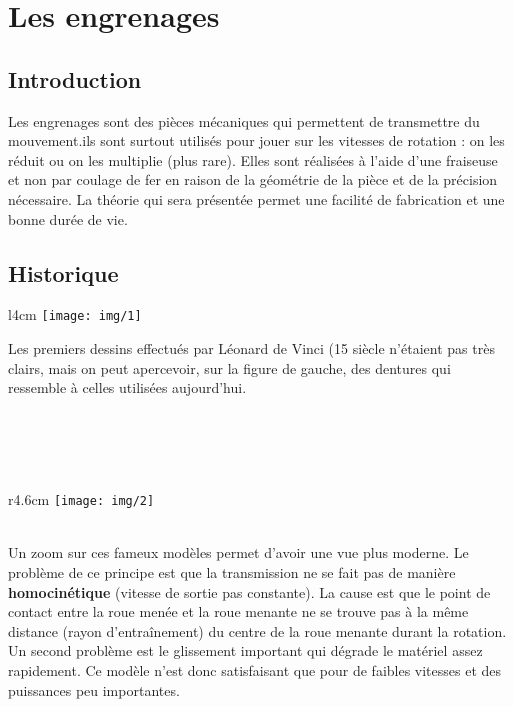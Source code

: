 
\chapter{Les engrenages}

\section{Introduction}
	\noindent Les engrenages sont des pièces mécaniques qui permettent de transmettre du mouvement.ils sont surtout utilisés pour jouer sur les vitesses de rotation : on les réduit ou on les multiplie (plus rare). Elles sont réalisées à l'aide d'une fraiseuse et non par coulage de fer en raison de la géométrie de la pièce et de la précision nécessaire. La théorie qui sera présentée permet une facilité de fabrication et une bonne durée de vie.

\section{Historique}
	\begin{wrapfigure}[4]{l}{4cm}
	\vspace{-5mm}
	\texttt{[image: img/1]}
	\end{wrapfigure}
	\noindent Les premiers dessins effectués par Léonard de Vinci (15 siècle n'étaient pas très clairs, mais on peut apercevoir, sur la figure de gauche, des dentures qui ressemble à celles utilisées aujourd'hui. \\\\\\\\\
	
	\begin{wrapfigure}[10]{r}{4.6cm}
	\texttt{[image: img/2]}
	\end{wrapfigure}	
	\ \\ Un zoom sur ces fameux modèles permet d'avoir une vue plus moderne. Le problème de ce principe est que la transmission ne se fait pas de manière \textbf{homocinétique} (vitesse de sortie pas constante). La cause est que le point de contact entre la roue menée et la roue menante ne se trouve pas à la même distance (rayon d'entraînement) du centre de la roue menante durant la rotation.  \\
	Un second problème est le glissement important qui dégrade le matériel assez rapidement. Ce modèle n'est donc satisfaisant que pour de faibles vitesses et des puissances peu importantes. 
	
